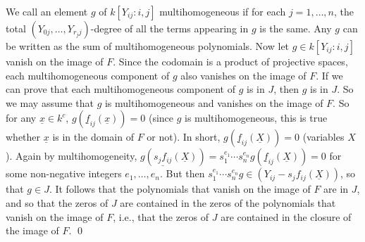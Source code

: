 We call an element $g$ of $k[Y_{ij}: i, j]$ multihomogeneous
if for each $j = 1, \ldots, n$,
the total $(Y_{0j}, \ldots, Y_{r_jj})$-degree of all the terms appearing
in $g$ is the same.
Any $g$ can be written as the sum of multihomogeneous polynomials.
Now let $g \in k[Y_{ij}: i, j]$ vanish on the image of $F$.
Since the codomain is a product of projective spaces,
each multihomogeneous component of $g$ also vanishes on the image of $F$.
If we can prove that each
multihomogeneous component of $g$ is in $J$,
then $g$ is in $J$.
So we may assume that $g$ is multihomogeneous and vanishes on the image
of $F$.
So for any $\underline x \in k^c$,
$g(\underline f_{ij} (\underline x)) = 0$
(since $g$ is multihomogeneous,
this is true whether $\underline x$ is in the domain of $F$ or not).
In short,
$g(\underline f_{ij} (\underline X)) = 0$ (variables $X$).
Again by multihomogeneity,
$g(\underline {s_j f_{ij}} (\underline X))
= s_1^{e_1} \cdots s_n^{e_n} g(\underline f_{ij} (\underline X)) = 0$
for some non-negative integers $e_1, \ldots, e_n$.
But then
$s_1^{e_1} \cdots s_n^{e_n} g
\in (Y_{ij} - s_j f_{ij}(\underline X))$,
so that $g \in J$.
It follows that the polynomials that vanish on the image of $F$ are in
$J$,
and so that the zeros of $J$ are contained
in the zeros of the polynomials that vanish on the image of $F$,
i.e.,
that the zeros of $J$ are contained in the closure of the image of $F$.
\qed

